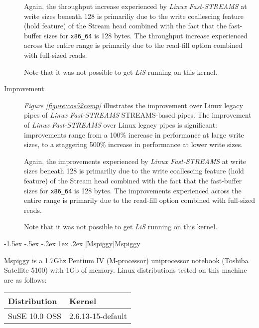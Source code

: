 \documentclass[letterpaper,final,notitlepage,twocolumn,10pt,twoside]{article}
\makeatletter
\let\normalsize = \small
\let\small = \footnotesize
\let\footnotesize = \scriptsize
\let\scriptsize = \tiny
\renewcommand\subsection{\@startsection{subsection}{2}{\z@}%
                                     {-1.5ex \@plus -.5ex \@minus -.2ex}%
                                     {1ex \@plus .2ex}%
                                     {\normalfont\normalsize\bfseries}}
\makeatother
\begin{document}
\begin{description}
Again, the throughput increase experienced by \textsl{Linux Fast-STREAMS} at write sizes beneath 128 is
primariliy due to the write coallescing feature (hold feature) of the Stream head combined with the
fact that the fast-buffer sizes for \texttt{x86\_64} is 128 bytes.
The throughput increase experienced across the entire range is primarily due to the read-fill option
combined with full-sized reads.

Note that it was not possible to get \textsl{LiS} running on this kernel.

\item[Improvement.]

\textit{Figure \ref{figure:cos52comp}}
illustrates the improvement over Linux legacy pipes of \textsl{Linux Fast-STREAMS} STREAMS-based
pipes.  The improvement of \textsl{Linux Fast-STREAMS} over Linux legacy pipes is significant:
improvements range from a 100\% increase in performance at large write sizes, to a staggering 500\%
increase in performance at lower write sizes.

Again, the improvements experienced by \textsl{Linux Fast-STREAMS} at write sizes beneath 128 is
primariliy due to the write coallescing feature (hold feature) of the Stream head combined with the
fact that the fast-buffer sizes for \texttt{x86\_64} is 128 bytes.
The improvements experienced across the entire range is primarily due to the read-fill option
combined with full-sized reads.

Note that it was not possible to get \textsl{LiS} running on this kernel.

\end{description}

\subsection[Mspiggy]{Mspiggy}

Mspiggy is a 1.7Ghz Pentium IV (M-processor) uniprocessor notebook (Toshiba Satellite 5100) with 1Gb
of memory.  Linux distributions tested on this machine are as follows:

\small
\setlength{\tabcolsep}{0.4em}
\setlength{\arraycolsep}{0.4em}
\begin{tabular}{ll}\\
Distribution & Kernel\\
\hline
SuSE 10.0 OSS & 2.6.13-15-default\\
\end{tabular}\\[1.0ex]
\normalsize
\end{document}

